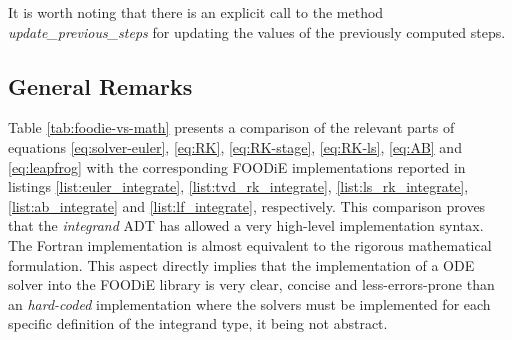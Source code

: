 \documentclass[pdftex,preprint,3p,times,numbers]{elsarticle}
\begin{document}
It is worth noting that there is an explicit call to the method \emph{update\_previous\_steps} for updating the values of the previously computed steps.

\subsection{General Remarks}\label{subsec:API-remarks}

Table \ref{tab:foodie-vs-math} presents a comparison of the relevant parts of equations \ref{eq:solver-euler}, \ref{eq:RK}, \ref{eq:RK-stage}, \ref{eq:RK-ls}, \ref{eq:AB} and \ref{eq:leapfrog} with the corresponding FOODiE implementations reported in listings \ref{list:euler_integrate}, \ref{list:tvd_rk_integrate}, \ref{list:ls_rk_integrate}, \ref{list:ab_integrate} and \ref{list:lf_integrate}, respectively. This comparison proves that the \emph{integrand} ADT has allowed a very high-level implementation syntax. The Fortran implementation is almost equivalent to the rigorous mathematical formulation. This aspect directly implies that the implementation of a ODE solver into the FOODiE library is very clear, concise and less-errors-prone than an \emph{hard-coded} implementation where the solvers must be implemented for each specific definition of the integrand type, it being not abstract.
\end{document}

